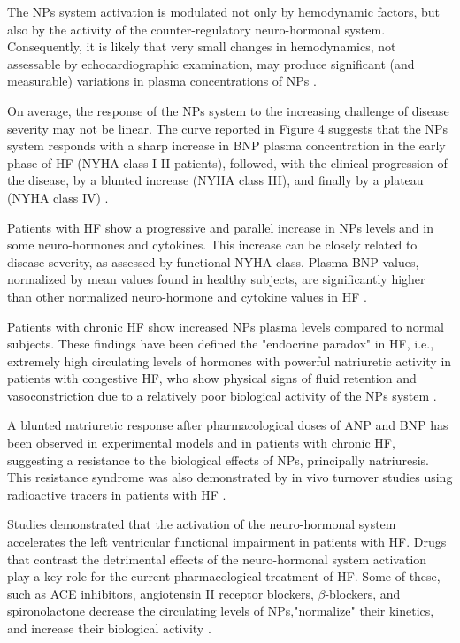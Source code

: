 \documentclass[14pt,a4paper,onecolumn]{extarticle}
\begin{document}
The NPs system activation is modulated not only by hemodynamic factors, but also by the activity of the counter-regulatory neuro-hormonal system. Consequently, it is likely that very small changes in hemodynamics, not assessable by echocardiographic examination, may produce significant (and measurable) variations in plasma concentrations of NPs \citep{bib360}. %

On average, the response of the NPs system to the increasing challenge of disease severity may not be linear. The curve reported in Figure 4 suggests that the NPs system responds with a sharp increase in BNP plasma concentration in the early phase of HF (NYHA class I-II patients), followed, with the clinical progression of the disease, by a blunted increase (NYHA class III), and finally by a plateau (NYHA class IV) \citep{bib333}. %

Patients with HF show a progressive and parallel increase in NPs levels and in some neuro-hormones and cytokines. This increase can be closely related to disease severity, as assessed by functional NYHA class. Plasma BNP values, normalized by mean values found in healthy subjects, are significantly higher than other normalized neuro-hormone and cytokine values in HF \citep{bib360}. %

Patients with chronic HF show increased NPs plasma levels compared to normal subjects. These findings have been defined the "endocrine paradox" in HF, i.e., extremely high circulating levels of hormones with powerful natriuretic activity in patients with congestive HF, who show physical signs of fluid retention and vasoconstriction due to a relatively poor biological activity of the NPs system \citep{bib36}. %

A blunted natriuretic response after pharmacological doses of ANP and BNP has been observed in experimental models and in patients with chronic HF, suggesting a resistance to the biological effects of NPs, principally natriuresis. This resistance syndrome was also demonstrated by in vivo turnover studies using radioactive tracers in patients with HF \citep{bib333}. %

Studies demonstrated that the activation of the neuro-hormonal system accelerates the left ventricular functional impairment in patients with HF. Drugs that contrast the detrimental effects of the neuro-hormonal system activation play a key role for the current pharmacological treatment of HF. Some of these, such as ACE inhibitors, angiotensin II receptor blockers, $\beta$-blockers, and spironolactone decrease the circulating levels of NPs,"normalize" their kinetics, and increase their biological activity \citep{bib35}.
\end{document}
